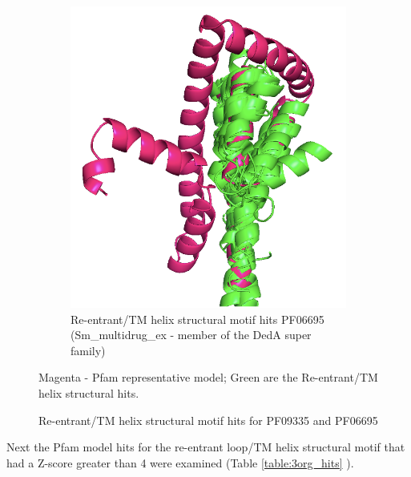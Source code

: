 \begin{figure}[htb]
\begin{subfigure}{0.3\textwidth}
  \includegraphics[width=\linewidth]{Pfam/PF06695.png}
  \caption{Re-entrant/TM helix structural motif hits PF06695 (Sm\_multidrug\_ex - member of the DedA super family)}
  \label{fig:sm}
\end{subfigure}
\caption{Re-entrant/TM helix structural motif hits for PF09335 and PF06695}
\small
Magenta - Pfam representative model; Green are the Re-entrant/TM helix structural hits. 
\label{fig:deda}
\end{figure}

Next the Pfam model hits for the re-entrant loop/TM helix  structural motif that had a Z-score greater than 4 were examined (Table \ref{table:3org_hits} ).


